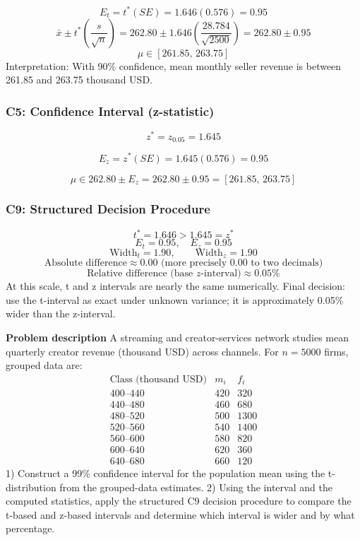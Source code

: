 \begin{ExamProblems}
		\[
		E_t=t^*(SE)=1.646(0.576)=0.95
		\]
		\[
		\bar{x}\pm t^*\left(\frac{s}{\sqrt{n}}\right)=262.80\pm 1.646\left(\frac{28.784}{\sqrt{2500}}\right)=262.80\pm 0.95
		\]
		\[
		\mu\in[261.85,\,263.75]
		\]
		Interpretation: With 90\% confidence, mean monthly seller revenue is between 261.85 and 263.75 thousand USD.

		\subsubsection*{C5: Confidence Interval (z-statistic)}
		\[
		z^*=z_{0.05}=1.645
		\]

		\[
		E_z=z^*(SE)=1.645(0.576)=0.95
		\]

		\[
		\mu\in 262.80\pm E_z=262.80\pm 0.95=[261.85,\,263.75]
		\]

		\subsubsection*{C9: Structured Decision Procedure}
		\[
		t^*=1.646>1.645=z^*
		\]
		\[
		E_t=0.95,\quad E_z=0.95
		\]
		\[
		\text{Width}_t=1.90,\qquad \text{Width}_z=1.90
		\]
		\[
		\text{Absolute difference}\approx 0.00\text{ (more precisely }0.00\text{ to two decimals)}
		\]
		\[
		\text{Relative difference (base }z\text{-interval)}\approx 0.05\%
		\]
		At this scale, t and z intervals are nearly the same numerically.
		Final decision: use the t-interval as exact under unknown variance; it is approximately 0.05\% wider than the z-interval.

		\newpage
		\item
		\textbf{Problem description}
		A streaming and creator-services network studies mean quarterly creator revenue (thousand USD) across channels.
		For $n=5000$ firms, grouped data are:
		\[
		\begin{array}{c|c|c}
		\text{Class (thousand USD)} & m_i & f_i\\\hline
		400\text{--}440 & 420 & 320\\
		440\text{--}480 & 460 & 680\\
		480\text{--}520 & 500 & 1300\\
		520\text{--}560 & 540 & 1400\\
		560\text{--}600 & 580 & 820\\
		600\text{--}640 & 620 & 360\\
		640\text{--}680 & 660 & 120
		\end{array}
		\]
		1) Construct a 99\% confidence interval for the population mean using the t-distribution from the grouped-data estimates.
		2) Using the interval and the computed statistics, apply the structured C9 decision procedure to compare the t-based and z-based intervals and determine which interval is wider and by what percentage.


\end{ExamProblems}
